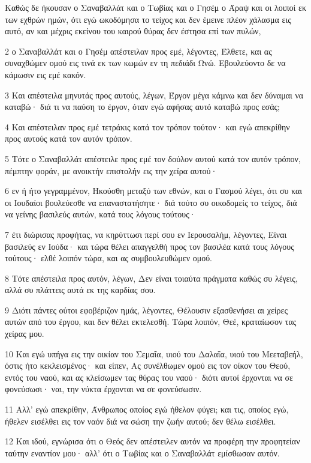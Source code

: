 \par Καθώς δε ήκουσαν ο Σαναβαλλάτ και ο Τωβίας και ο Γησέμ ο Άραψ και οι λοιποί εκ των εχθρών ημών, ότι εγώ ωκοδόμησα το τείχος και δεν έμεινε πλέον χάλασμα εις αυτό, αν και μέχρις εκείνου του καιρού θύρας δεν έστησα επί των πυλών,
\par 2 ο Σαναβαλλάτ και ο Γησέμ απέστειλαν προς εμέ, λέγοντες, Έλθετε, και ας συναχθώμεν ομού εις τινά εκ των κωμών εν τη πεδιάδι Ωνώ. Εβουλεύοντο δε να κάμωσιν εις εμέ κακόν.
\par 3 Και απέστειλα μηνυτάς προς αυτούς, λέγων, Έργον μέγα κάμνω και δεν δύναμαι να καταβώ· διά τι να παύση το έργον, όταν εγώ αφήσας αυτό καταβώ προς εσάς;
\par 4 Και απέστειλαν προς εμέ τετράκις κατά τον τρόπον τούτον· και εγώ απεκρίθην προς αυτούς κατά τον αυτόν τρόπον.
\par 5 Τότε ο Σαναβαλλάτ απέστειλε προς εμέ τον δούλον αυτού κατά τον αυτόν τρόπον, πέμπτην φοράν, με ανοικτήν επιστολήν εις την χείρα αυτού·
\par 6 εν ή ήτο γεγραμμένον, Ηκούσθη μεταξύ των εθνών, και ο Γασμού λέγει, ότι συ και οι Ιουδαίοι βουλεύεσθε να επαναστατήσητε· διά τούτο συ οικοδομείς το τείχος, διά να γείνης βασιλεύς αυτών, κατά τους λόγους τούτους·
\par 7 έτι διώρισας προφήτας, να κηρύττωσι περί σου εν Ιερουσαλήμ, λέγοντες, Είναι βασιλεύς εν Ιούδα· και τώρα θέλει απαγγελθή προς τον βασιλέα κατά τους λόγους τούτους· ελθέ λοιπόν τώρα, και ας συμβουλευθώμεν ομού.
\par 8 Τότε απέστειλα προς αυτόν, λέγων, Δεν είναι τοιαύτα πράγματα καθώς συ λέγεις, αλλά συ πλάττεις αυτά εκ της καρδίας σου.
\par 9 Διότι πάντες ούτοι εφοβέριζον ημάς, λέγοντες, Θέλουσιν εξασθενήσει αι χείρες αυτών από του έργου, και δεν θέλει εκτελεσθή. Τώρα λοιπόν, Θεέ, κραταίωσον τας χείρας μου.
\par 10 Και εγώ υπήγα εις την οικίαν του Σεμαΐα, υιού του Δαλαΐα, υιού του Μεεταβεήλ, όστις ήτο κεκλεισμένος· και είπεν, Ας συνέλθωμεν ομού εις τον οίκον του Θεού, εντός του ναού, και ας κλείσωμεν τας θύρας του ναού· διότι αυτοί έρχονται να σε φονεύσωσι· ναι, την νύκτα έρχονται να σε φονεύσωσιν.
\par 11 Αλλ' εγώ απεκρίθην, Άνθρωπος οποίος εγώ ήθελον φύγει; και τις, οποίος εγώ, ήθελεν εισέλθει εις τον ναόν διά να σώση την ζωήν αυτού; δεν θέλω εισέλθει.
\par 12 Και ιδού, εγνώρισα ότι ο Θεός δεν απέστειλεν αυτόν να προφέρη την προφητείαν ταύτην εναντίον μου· αλλ' ότι ο Τωβίας και ο Σαναβαλλάτ εμίσθωσαν αυτόν.
